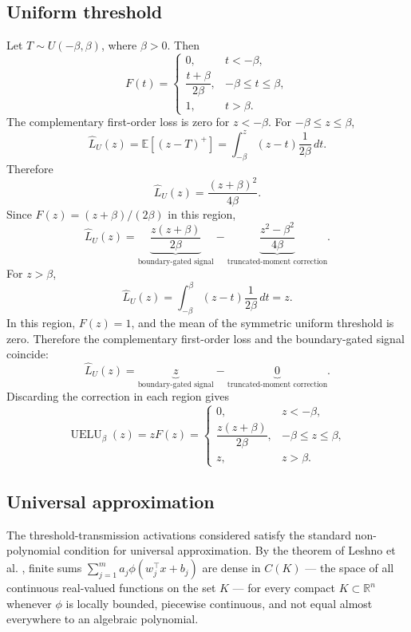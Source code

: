 \documentclass[11pt]{article}
\begin{document}
\subsection{Uniform threshold}

Let $ T\sim U(-\beta,\beta) $, where $ \beta>0 $. Then
$$
F(t)=
\begin{cases}
0, & t<-\beta,\\
\dfrac{t+\beta}{2\beta}, & -\beta\le t\le \beta,\\
1, & t>\beta.
\end{cases}
$$
The complementary first-order loss is zero for $ z<-\beta $. For $ -\beta\le z\le \beta $,
$$
\widehat{L}_{U}(z)
=
\mathbb{E}[(z-T)^+]
=
\int_{-\beta}^z (z-t)\frac{1}{2\beta}\,dt.
$$
Therefore
$$
\widehat{L}_{U}(z)
=
\frac{(z+\beta)^2}{4\beta}.
$$
Since $ F(z)=(z+\beta)/(2\beta) $ in this region, 
$$
\widehat{L}_{U}(z)
=
\underbrace{\frac{z(z+\beta)}{2\beta}}_{\text{boundary-gated signal}}
-
\underbrace{\frac{z^2-\beta^2}{4\beta}}_{\text{truncated-moment correction}}.
$$
For $ z>\beta $,
$$
\widehat{L}_{U}(z)
=
\int_{-\beta}^{\beta} (z-t)\frac{1}{2\beta}\,dt
=
z.
$$
In this region, $ F(z)=1 $, and the mean of the symmetric uniform threshold is zero. Therefore the complementary first-order loss and the boundary-gated signal coincide:
$$
\widehat{L}_{U}(z)
=
\underbrace{z}_{\text{boundary-gated signal}}
-
\underbrace{0}_{\text{truncated-moment correction}}.
$$
Discarding the correction in each region gives
$$
\operatorname{UELU}_{\beta}(z)
=
zF(z)
=
\begin{cases}
0, & z<-\beta,\\
\dfrac{z(z+\beta)}{2\beta}, & -\beta\le z\le \beta,\\
z, & z>\beta.
\end{cases}
$$

\subsection{Universal approximation}

The threshold-transmission activations considered satisfy the standard non-polynomial condition for universal approximation. By the theorem of Leshno et al.  \cite{Leshno1993}, finite sums
$\sum_{j=1}^{m} a_j \phi(w_j^\top x+b_j)$
are dense in $C(K)$ --- the space of all continuous real-valued functions on the set $K$ --- for every compact $K\subset\mathbb{R}^n$ whenever $\phi$ is locally bounded, piecewise continuous, and not equal almost everywhere to an algebraic polynomial.
\end{document}
